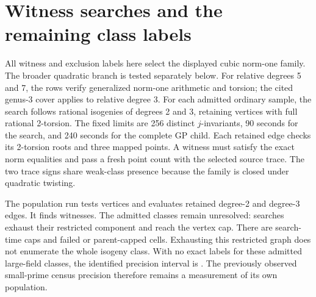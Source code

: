 \documentclass[11pt]{article}
\begin{document}
\section{Witness searches and the remaining class labels}
All witness and exclusion labels here select the displayed cubic norm-one
family. The broader quadratic branch is tested separately below.
For relative degrees 5 and 7, the rows verify generalized norm-one arithmetic
and torsion; the cited genus-3 cover applies to relative degree 3.
For each admitted ordinary sample, the search follows rational isogenies
of degrees 2 and 3, retaining vertices with full rational 2-torsion.
The fixed limits are 256 distinct $j$-invariants, 90 seconds for the search,
and 240 seconds for the complete GP child. Each retained edge checks its
2-torsion roots and three mapped points. A witness must satisfy the exact
norm equalities and pass a fresh point count with the selected source trace.
The two trace signs share weak-class presence because the family is closed
under quadratic twisting.

The population run tests \TotalVertices{} vertices and evaluates
\TotalEdgesTwo{} retained degree-2 and \TotalEdgesThree{} degree-3 edges.
It finds \TotalWitnesses{} witnesses. The \TotalUnresolved{} admitted
classes remain unresolved: \ComponentExhausted{} searches exhaust their
restricted component and \VertexCapped{} reach the vertex cap.
There are \SearchTimeCapped{} search-time caps and \FailedCells{} failed
or parent-capped cells. Exhausting this restricted graph does not enumerate
the whole isogeny class. With no exact labels for these admitted large-field
classes, the identified precision interval is \PrecisionInterval{}.
The previously observed small-prime census precision therefore remains a
measurement of its own population.
\end{document}
